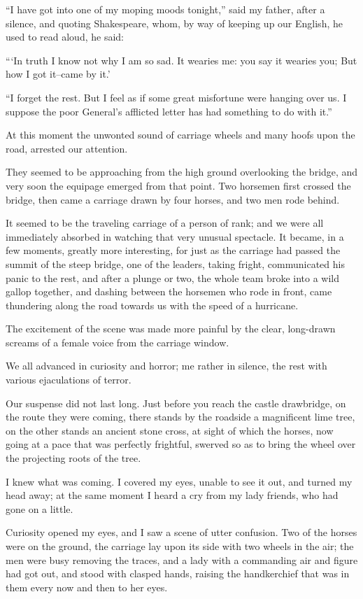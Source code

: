 \documentclass[11pt,twoside,makeidx,hidelinks,]{memoir}
\begin{document}
``I have got into one of my moping moods tonight,'' said my father, after
a silence, and quoting Shakespeare, whom, by way of keeping up our
English, he used to read aloud, he said:

``{}`In truth I know not why I am so sad.
  It wearies me: you say it wearies you;
  But how I got it--came by it.'

``I forget the rest. But I feel as if some great misfortune were hanging
over us. I suppose the poor General's afflicted letter has had something
to do with it.''

At this moment the unwonted sound of carriage wheels and many hoofs upon
the road, arrested our attention.

They seemed to be approaching from the high ground overlooking the
bridge, and very soon the equipage emerged from that point. Two horsemen
first crossed the bridge, then came a carriage drawn by four horses, and
two men rode behind.

It seemed to be the traveling carriage of a person of rank; and we were
all immediately absorbed in watching that very unusual spectacle. It
became, in a few moments, greatly more interesting, for just as the
carriage had passed the summit of the steep bridge, one of the leaders,
taking fright, communicated his panic to the rest, and after a plunge or
two, the whole team broke into a wild gallop together, and dashing
between the horsemen who rode in front, came thundering along the road
towards us with the speed of a hurricane.

The excitement of the scene was made more painful by the clear,
long-drawn screams of a female voice from the carriage window.

We all advanced in curiosity and horror; me rather in silence, the rest
with various ejaculations of terror.

Our suspense did not last long. Just before you reach the castle
drawbridge, on the route they were coming, there stands by the roadside
a magnificent lime tree, on the other stands an ancient stone cross, at
sight of which the horses, now going at a pace that was perfectly
frightful, swerved so as to bring the wheel over the projecting roots
of the tree.

I knew what was coming. I covered my eyes, unable to see it out, and
turned my head away; at the same moment I heard a cry from my lady
friends, who had gone on a little.

Curiosity opened my eyes, and I saw a scene of utter confusion. Two of
the horses were on the ground, the carriage lay upon its side with two
wheels in the air; the men were busy removing the traces, and a lady
with a commanding air and figure had got out, and stood with clasped
hands, raising the handkerchief that was in them every now and then
to her eyes.
\end{document}
